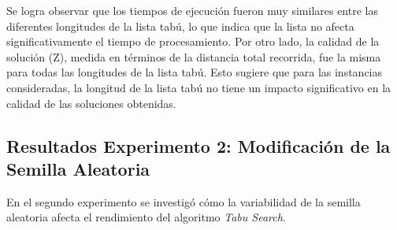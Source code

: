 \documentclass[letter, 10pt]{article}
\begin{document}
Se logra observar que los tiempos de ejecución fueron muy similares entre las diferentes longitudes de la lista tabú, lo que indica que la lista no afecta significativamente el tiempo de procesamiento. Por otro lado, la calidad de la solución (Z), medida en términos de la distancia total recorrida, fue la misma para todas las longitudes de la lista tabú. Esto sugiere que para las instancias consideradas, la longitud de la lista tabú no tiene un impacto significativo en la calidad de las soluciones obtenidas.

\subsection{Resultados Experimento 2: Modificación de la Semilla Aleatoria}

En el segundo experimento se investigó cómo la variabilidad de la semilla aleatoria afecta el rendimiento del algoritmo \textit{Tabu Search}.
\end{document}
